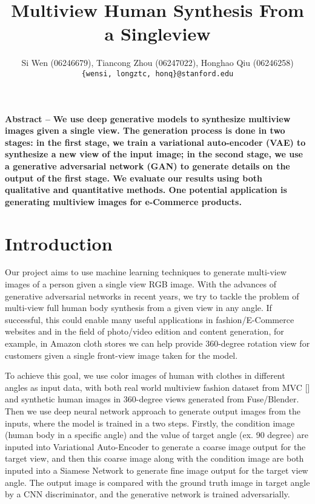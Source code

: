 \documentclass[10pt,conference]{IEEEtran}
\title{Multiview Human Synthesis From a Singleview}
\author{Si Wen (06246679), Tiancong Zhou (06247022), Honghao Qiu (06246258)\\
\texttt{\{wensi, longztc, honq\}{@}stanford.edu}}
\begin{document}
\maketitle

\newcommand{\R}{\mathbb{R}}
\newcommand{\eqnset}[1]{\left.\mbox{$#1$}\quad\quad\right\rbrace}
\newcommand{\tr}{\text{tr}\;}
\renewcommand{\th}{\theta}
\newcommand{\toi}{^{(i)}}


\textbf{Abstract --  }
\textbf{We use deep generative models to synthesize multiview images given a single view. The generation process is done in two stages: in the first stage, we train a variational auto-encoder (VAE) to synthesize a new view of the input image; in the second stage, we use a generative adversarial network (GAN) to generate details on the output of the first stage. We evaluate our results using both qualitative and quantitative methods. One potential application is generating multiview images for e-Commerce products.}


\section{Introduction} 
Our project aims to use machine learning techniques to generate multi-view images of a person given a single view RGB image. With the advances of generative adversarial networks in recent years, we try to tackle the problem of multi-view full human body synthesis from a given view in any angle. If successful, this could enable many useful applications in fashion/E-Commerce websites and in the field of photo/video edition and content generation, for example, in Amazon cloth stores we can help provide 360-degree rotation view for customers given a single front-view image taken for the model. 

To achieve this goal, we use color images of human with clothes in different angles as input data, with both real world multiview fashion dataset from MVC [] and synthetic human images in 360-degree views generated from Fuse/Blender. Then we use deep neural network approach to generate output images from the inputs, where the model is trained in a two steps. Firstly, the condition image (human body in a specific angle) and the value of target angle (ex. 90 degree) are inputed into Variational Auto-Encoder to generate a coarse image output for the target view, and then this coarse image along with the condition image are both inputed into a Siamese Network to generate fine image output for the target view angle. The output image is compared with the ground truth image in target angle by a CNN discriminator, and the generative network is trained adversarially. 
\end{document}
